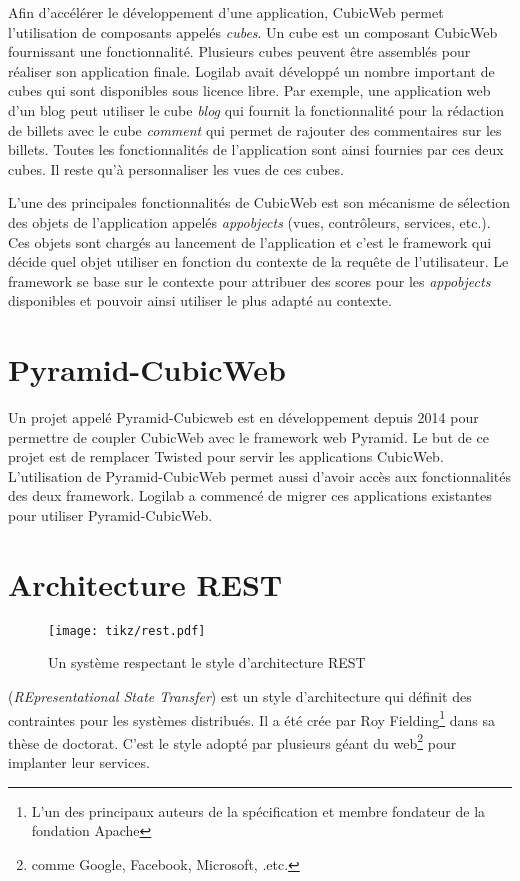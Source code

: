 Afin d'accélérer le développement d'une application, CubicWeb permet
l'utilisation de composants appelés \emph{cubes}. Un cube est un composant
CubicWeb fournissant une fonctionnalité. Plusieurs cubes peuvent être assemblés
pour réaliser son application finale. Logilab avait développé un nombre
important de cubes qui sont disponibles sous licence libre. Par exemple, une
application web d'un blog peut utiliser le cube \textit{blog} qui fournit la
fonctionnalité pour la rédaction de billets avec le cube \textit{comment} qui
permet de rajouter des commentaires sur les billets. Toutes les fonctionnalités
de l'application sont ainsi fournies par ces deux cubes. Il reste qu'à
personnaliser les vues de ces cubes.

L'une des principales fonctionnalités de CubicWeb est son mécanisme de
sélection des objets de l'application appelés \textit{appobjects} (vues,
contrôleurs, services, etc.). Ces objets sont chargés au lancement de
l'application et c'est le framework qui décide quel objet utiliser en fonction
du contexte de la requête de l'utilisateur. Le framework se base sur le
contexte pour attribuer des scores pour les \textit{appobjects} disponibles et
pouvoir ainsi utiliser le plus adapté au contexte.  

\section{Pyramid-CubicWeb} Un projet appelé Pyramid-Cubicweb est en
développement depuis 2014 pour permettre de coupler CubicWeb avec le framework
web Pyramid. Le but de ce projet est de remplacer Twisted pour servir les
applications CubicWeb. L'utilisation de Pyramid-CubicWeb permet aussi d'avoir
accès aux fonctionnalités des deux framework. Logilab a commencé de migrer ces
applications existantes pour utiliser Pyramid-CubicWeb.
 
\section{Architecture REST} 
\begin{figure} 
    \centering
    \texttt{[image: tikz/rest.pdf]} 
    \caption{Un système respectant le style d'architecture REST} 
    \label{fig:rest} 
\end{figure}

 (\textit{REpresentational State Transfer}) est un style
d'architecture qui définit des contraintes pour les systèmes
 distribués. Il a été crée par Roy
Fielding\footnote{L’un des principaux auteurs de la spécification
 et membre fondateur de la fondation Apache} dans sa thèse
de doctorat\cite{restthesise}. C'est le style adopté par plusieurs géant du
web\footnote{comme Google, Facebook, Microsoft, .etc.} pour implanter leur
services. 

